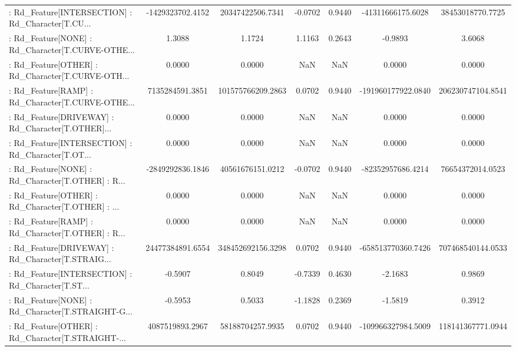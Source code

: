 \begin{longtable}{p{4cm}cccccc}
 : Rd\_Feature[INTERSECTION] : Rd\_Character[T.CU... &  -1429323702.4152 &  20347422506.7341 & -0.0702 &       0.9440 &  -41311666175.6028 &  38453018770.7725 \\
 : Rd\_Feature[NONE] : Rd\_Character[T.CURVE-OTHE... &            1.3088 &            1.1724 &  1.1163 &       0.2643 &            -0.9893 &            3.6068 \\
 : Rd\_Feature[OTHER] : Rd\_Character[T.CURVE-OTH... &            0.0000 &            0.0000 &     NaN &          NaN &             0.0000 &            0.0000 \\
 : Rd\_Feature[RAMP] : Rd\_Character[T.CURVE-OTHE... &   7135284591.3851 & 101575766209.2863 &  0.0702 &       0.9440 & -191960177922.0840 & 206230747104.8541 \\
 : Rd\_Feature[DRIVEWAY] : Rd\_Character[T.OTHER]... &            0.0000 &            0.0000 &     NaN &          NaN &             0.0000 &            0.0000 \\
 : Rd\_Feature[INTERSECTION] : Rd\_Character[T.OT... &            0.0000 &            0.0000 &     NaN &          NaN &             0.0000 &            0.0000 \\
 : Rd\_Feature[NONE] : Rd\_Character[T.OTHER] : R... &  -2849292836.1846 &  40561676151.0212 & -0.0702 &       0.9440 &  -82352957686.4214 &  76654372014.0523 \\
 : Rd\_Feature[OTHER] : Rd\_Character[T.OTHER] : ... &            0.0000 &            0.0000 &     NaN &          NaN &             0.0000 &            0.0000 \\
 : Rd\_Feature[RAMP] : Rd\_Character[T.OTHER] : R... &            0.0000 &            0.0000 &     NaN &          NaN &             0.0000 &            0.0000 \\
 : Rd\_Feature[DRIVEWAY] : Rd\_Character[T.STRAIG... &  24477384891.6554 & 348452692156.3298 &  0.0702 &       0.9440 & -658513770360.7426 & 707468540144.0533 \\
 : Rd\_Feature[INTERSECTION] : Rd\_Character[T.ST... &           -0.5907 &            0.8049 & -0.7339 &       0.4630 &            -2.1683 &            0.9869 \\
 : Rd\_Feature[NONE] : Rd\_Character[T.STRAIGHT-G... &           -0.5953 &            0.5033 & -1.1828 &       0.2369 &            -1.5819 &            0.3912 \\
 : Rd\_Feature[OTHER] : Rd\_Character[T.STRAIGHT-... &   4087519893.2967 &  58188704257.9935 &  0.0702 &       0.9440 & -109966327984.5009 & 118141367771.0944 \\

\end{longtable}
